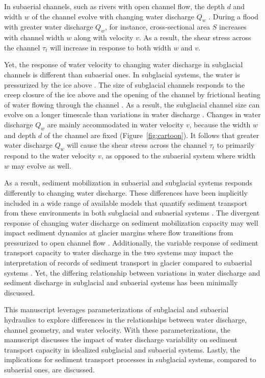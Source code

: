 \documentclass[11pt]{article}
\begin{document}
\begin{spacing}{1}
In subaerial channels, such as rivers with open channel flow, the depth $d$ and width $w$ of the channel evolve with changing water discharge $Q_w$ \citep{leopold1953}. During a flood with greater water discharge $Q_w$, for instance, cross-sectional area $S$ increases with channel width $w$ along with velocity $v$. As a result, the shear stress across the channel $\tau_t$ will increase in response to both width $w$ and $v$. 

Yet, the response of water velocity to changing water discharge in subglacial channels is different than subaerial ones.
In subglacial systems, the water is pressurized by the ice above \citep{shreve1972}.
The size of subglacial channels responds to the creep closure of the ice above and the opening of the channel by frictional heating of water flowing through the channel \citep{rothlisberger1972}. As a result, the subglacial channel size can evolve on a longer timescale than variations in water discharge \citep[e.g.][]{iken1986,andrews2014,nanni2020}.
Changes in water discharge $Q_w$ are mainly accommodated in water velocity $v$, because the width $w$ and depth $d$ of the channel are fixed (Figure~\ref{fig:cartoon}).
It follows that greater water discharge $Q_w$ will cause the shear stress across the channel $\tau_t$ to primarily respond to the water velocity $v$, as opposed to the subaerial system where width $w$ may evolve as well. 

As a result, sediment mobilization in subaerial and subglacial systems responds differently to changing water discharge.
These differences have been implicitly included in a wide range of available models that  quantify sediment transport from these environments in both subglacial and subaerial systems  \citep[e.g.][]{walder1994,tucker1997,creyts2013,wickert2019,delaney2019}.
  The divergent response of changing water discharge on sediment mobilization capacity may well impact sediment dynamics at glacier margins where flow transitions from pressurized to open channel flow \citep[e.g.][]{lane2016}.
  Additionally, the variable response of sediment transport capacity to water discharge in the two systems may impact the interpretation of records of sediment transport in glacier compared to subaerial systems \citep[e.g.][]{muller1968,richards2003}.
  Yet, the differing relationship between variations in water discharge and sediment discharge in subglacial and subaerial systems has been minimally discussed.
  
 This manuscript leverages parameterizations of subglacial and subaerial hydraulics to explore differences in the relationships between  water discharge, channel geometry, and water velocity. 
 With these parameterizations, the manuscript discusses the impact of water discharge variability on sediment transport capacity in idealized subglacial and subaerial systems.
  Lastly, the implications for sediment transport processes in subglacial systems, compared to subaerial ones, are discussed.
  

\end{spacing}
\end{document}
